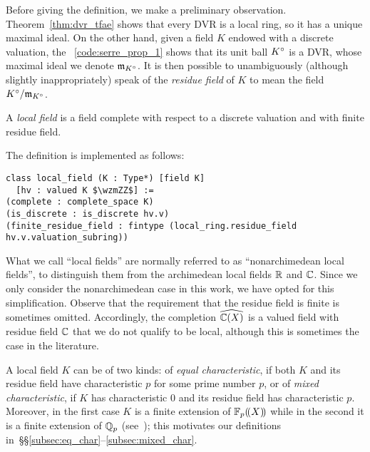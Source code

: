 \documentclass[sigplan,10pt, nonacm, review]{acmart}
\begin{document}
Before giving the definition, we make a preliminary observation. Theorem~\ref{thm:dvr_tfae} shows that every DVR is a local ring, so it has a unique maximal ideal. On the other hand, given a field $K$ endowed with a discrete valuation, the \LClistingname~\ref{code:serre_prop_1} shows that its unit ball $\ball{K}$ is a DVR, whose maximal ideal we denote $\maxid[\ball{K}]$. It is then possible to unambiguously (although slightly inappropriately) speak of the \emph{residue field} of $K$ to mean the field $\ball{K}/\maxid[\ball{K}]$.

\begin{definition}\label{def:local_field}
A \emph{local field} is a field complete with respect to a discrete valuation and with finite residue field.
\end{definition}
The definition is implemented as follows:\href{https://github.com/LCFT-Lean/local_fields/blob/76ad487d09babdb0018f394a5634526637ee014a/src/local_field.lean#L30}{\extlink}
\begin{lstlisting}
class local_field (K : Type*) [field K] 
  [hv : valued K $\wzmZZ$] :=
(complete : complete_space K)
(is_discrete : is_discrete hv.v)
(finite_residue_field : fintype (local_ring.residue_field hv.v.valuation_subring))
\end{lstlisting}

\begin{remark}
What we call ``local fields'' are normally referred to as ``nonarchimedean local fields'', to distinguish them from the archimedean local fields $\RR$ and $\CC$. Since we only consider the nonarchimedean case in this work, we have opted for this simplification. Observe that the requirement that the residue field is finite is sometimes omitted. Accordingly, the completion $\FpXCompl[\CC]$ is a valued field with residue field $\CC$ that we do not qualify to be local, although this is sometimes the case in the literature.
\end{remark}

A local field $K$ can be of two kinds: of \emph{equal characteristic}, if both $K$ and its residue field have characteristic $p$ for some prime number $p$, or of \emph{mixed characteristic}, if $K$ has characteristic $0$ and its residue field has characteristic $p$. Moreover, in the first case $K$ is a finite extension of $\laurentseries$ while in the second it is a finite extension of $\QQ_p$ (see~\cite[Chapitre~VI,~\S9, n$^\circ$3]{Bou85}); this motivates our definitions in~\S\S\ref{subsec:eq_char}--\ref{subsec:mixed_char}.
\end{document}
